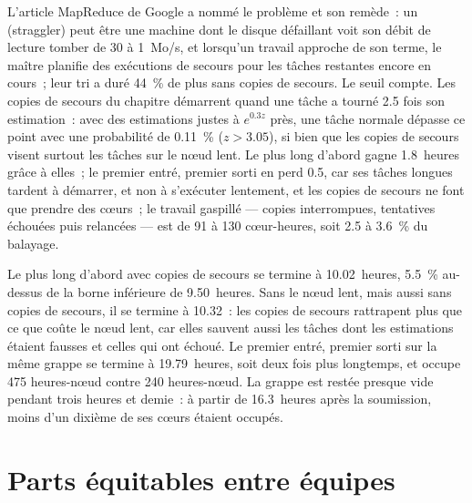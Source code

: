 L'article MapReduce de Google a nommé le problème et son remède~: un  (straggler) peut être une machine dont le disque défaillant voit son débit de lecture tomber de 30 à
1~Mo/s, et lorsqu'un travail approche de son terme, le maître planifie des exécutions de secours pour les tâches restantes encore en cours~; leur tri a duré
44~\% de plus sans copies de secours. Le seuil compte. Les copies de secours du chapitre démarrent quand une tâche a tourné 2.5 fois son estimation~: avec
des estimations justes à $e^{0.3z}$ près, une tâche normale dépasse ce point avec une probabilité de 0.11~\% ($z > 3.05$), si bien que les copies de secours visent surtout les tâches
sur le nœud lent. Le plus long d'abord gagne 1.8~heures grâce à elles~; le premier entré, premier sorti en perd 0.5, car ses tâches longues tardent à démarrer, et non
à s'exécuter lentement, et les copies de secours ne font que prendre des cœurs~; le travail gaspillé --- copies interrompues, tentatives échouées puis relancées --- est de 91 à 130
cœur-heures, soit 2.5 à 3.6~\% du balayage.

\label{lst:pl:distributed-compute-and-schedulers:spec}

\begin{example}\label{ex:pl:distributed-compute-and-schedulers:sweep}
Le plus long d'abord avec copies de secours se termine à 10.02~heures, 5.5~\% au-dessus de la borne inférieure de 9.50~heures. Sans le nœud lent, mais aussi sans copies de secours,
il se termine à 10.32~: les copies de secours rattrapent plus que ce que coûte le nœud lent, car elles sauvent aussi les tâches dont les estimations étaient
fausses et celles qui ont échoué. Le premier entré, premier sorti sur la même grappe se termine à 19.79~heures, soit deux fois plus longtemps, et occupe 475 heures-nœud contre
240 heures-nœud. La grappe est restée presque vide pendant trois heures et demie~: à partir de 16.3~heures après la soumission, moins d'un dixième de ses cœurs étaient
occupés.
\end{example}

\section{Parts équitables entre équipes}

